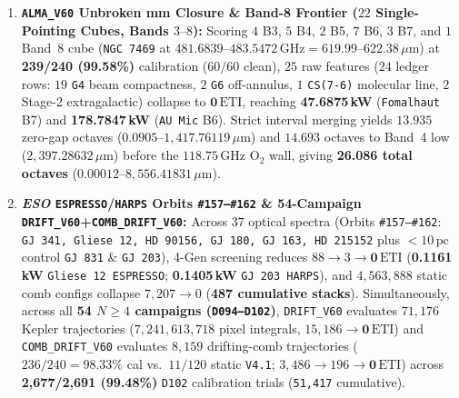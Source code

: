 \documentclass[twocolumn,10pt]{article}
\begin{document}
\begin{enumerate}
  \item \textbf{\texttt{ALMA\_V60} Unbroken mm Closure \& Band-8 Frontier ($22$ Single-Pointing Cubes, Bands $3\text{--}8$):} Scoring $4$ B3, $5$ B4, $2$ B5, $7$ B6, $3$ B7, and $1$ Band~8 cube (\texttt{NGC\,7469} at $481.6839\text{--}483.5472\,\text{GHz} = 619.99\text{--}622.38\,\mu\text{m}$) at \textbf{239/240 (99.58\%)} calibration ($60/60$ clean), $25$ raw features ($24$ ledger rows: $19$ \texttt{G4} beam compactness, $2$ \texttt{G6} off-annulus, $1$ \texttt{CS(7-6)} molecular line, $2$ Stage-2 extragalactic) collapse to $\mathbf{0\,\mathrm{ETI}}$, reaching \textbf{47.6875\,kW} (\texttt{Fomalhaut} B7) and \textbf{178.7847\,kW} (\texttt{AU\,Mic} B6). Strict interval merging yields $13.935$ zero-gap octaves ($0.0905\text{--}1{,}417.76119\,\mu\text{m}$) and $14.693$ octaves to Band~4 low ($2{,}397.28632\,\mu\text{m}$) before the $118.75\,\text{GHz}$ $\mathrm{O_2}$ wall, giving \textbf{26.086 total octaves} ($0.00012\text{--}8{,}556.41831\,\mu\text{m}$).
  \item \textbf{\textit{ESO} \texttt{ESPRESSO}/\texttt{HARPS} Orbits \texttt{\#157--\#162} \& 54-Campaign \texttt{DRIFT\_V60}+\texttt{COMB\_DRIFT\_V60}:} Across $37$ optical spectra (Orbits \texttt{\#157--\#162}: \texttt{GJ\,341, Gliese\,12, HD\,90156, GJ\,180, GJ\,163, HD\,215152} plus $<10\,\text{pc}$ control \texttt{GJ\,831} \& \texttt{GJ\,203}), 4-Gen screening reduces $88 \rightarrow 3 \rightarrow \mathbf{0\,\mathrm{ETI}}$ (\textbf{0.1161\,kW} \texttt{Gliese\,12 ESPRESSO}; \textbf{0.1405\,kW} \texttt{GJ\,203 HARPS}), and $4{,}563{,}888$ static comb configs collapse $7{,}207 \rightarrow 0$ (\textbf{487 cumulative stacks}). Simultaneously, across all \textbf{54 $N\ge 4$ campaigns (\texttt{D094--D102})}, \texttt{DRIFT\_V60} evaluates $71{,}176$ Kepler trajectories ($7{,}241{,}613{,}718$ pixel integrals, $15{,}186 \rightarrow \mathbf{0\,\mathrm{ETI}}$) and \texttt{COMB\_DRIFT\_V60} evaluates $8{,}159$ drifting-comb trajectories ($236/240 = 98.33\%$ cal vs.\ $11/120$ static \texttt{V4.1}; $3{,}486 \rightarrow 196 \rightarrow \mathbf{0\,\mathrm{ETI}}$) across \textbf{2,677/2,691 (99.48\%)} \texttt{D102} calibration trials (\texttt{51,417} cumulative).
\end{enumerate}
\end{document}
